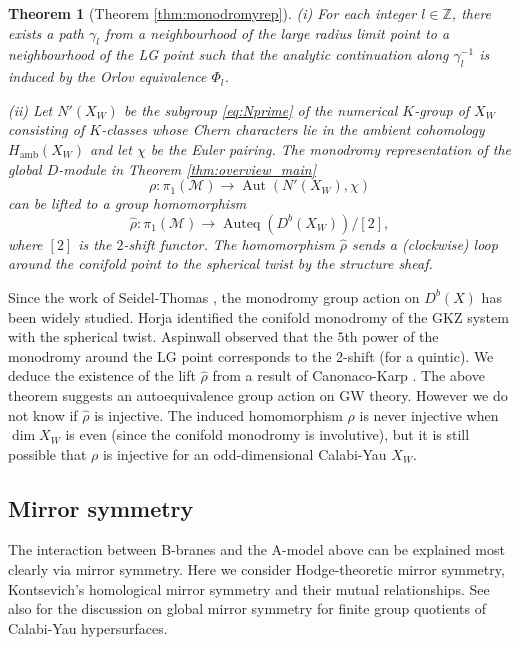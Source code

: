 \documentclass[11pt]{amsart}
\newtheorem{thm}{Theorem}[section] %
\theoremstyle{definition} %
\theoremstyle{remark} %
\newcommand{\ZZ}{\mathbb Z}
\newcommand{\Aut}{\operatorname{Aut}}
\newcommand{\cM}{\mathcal{M}}
\newcommand{\hrho}{\hat{\rho}}
\newcommand{\amb}{\operatorname{amb}}
\newcommand{\Auteq}{\operatorname{Auteq}}
\begin{document}
\begin{thm}[Theorem \ref{thm:monodromyrep}] 
\label{thm:overview-autoeq}
{\rm (i)} For each integer $l\in \ZZ$, there exists a path 
$\gamma_l$ from a neighbourhood of the large radius limit point to 
a neighbourhood of the LG point 
such that the analytic continuation along $\gamma_l^{-1}$ 
is induced by the Orlov equivalence $\Phi_l$. 

{\rm (ii)} 
Let $N'(X_W)$ be the subgroup \eqref{eq:Nprime} of the 
numerical $K$-group of $X_W$ consisting of $K$-classes 
whose Chern characters lie in the ambient cohomology 
$H_{\amb}(X_W)$ 
and let $\chi$ be the Euler pairing. 
The monodromy representation of the 
global $D$-module in Theorem \ref{thm:overview_main}
\[
\rho \colon \pi_1(\cM) \to \Aut(N'(X_W),\chi)
\]
can be lifted to a group homomorphism 
\[
\hrho \colon \pi_1(\cM)
\to \Auteq(D^b(X_W))/[2], 
\] 
where $[2]$ is the $2$-shift functor. 
The homomorphism $\hrho$ sends a (clockwise) loop around the conifold 
point to the spherical twist by the structure sheaf. 
\end{thm} 

Since the work of Seidel-Thomas \cite{Seidel-Thomas}, 
the monodromy group action on $D^b(X)$ has been 
widely studied. 
Horja \cite{Ho} identified the conifold monodromy of the GKZ 
system with the spherical twist. 
Aspinwall \cite[\S 7.1.4]{Aspinwall:Dbrane} 
observed that the $5$th power of 
the monodromy around the LG point corresponds 
to the 2-shift (for a quintic). 
We deduce the existence of the lift $\hrho$ 
from a result of Canonaco-Karp \cite{Cano-Karp}. 
The above theorem suggests an autoequivalence 
group action on GW theory. 
However we do not know if $\hrho$ is injective. 
The induced homomorphism $\rho$ is never injective 
when $\dim X_W$ is even (since the conifold monodromy is 
involutive), but it is still possible that $\rho$ 
is injective for an odd-dimensional Calabi-Yau $X_W$. 

\subsection{Mirror symmetry} 
The interaction between B-branes and the A-model above 
can be explained most clearly via mirror symmetry. 
Here we consider Hodge-theoretic mirror symmetry, 
Kontsevich's homological mirror symmetry \cite{Kontsevich:ICM} 
and their mutual relationships. 
See also \cite{CR:LGconference} for the discussion 
on global mirror symmetry for finite group quotients 
of Calabi-Yau hypersurfaces. 
\end{document}
